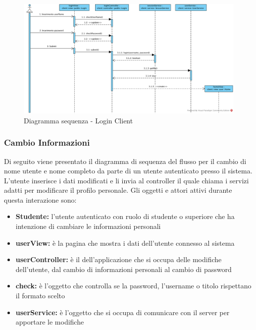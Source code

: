 \documentclass[12pt,a4paper]{article}
\begin{document}
\begin{center}
	\begin{figure}[H]
		\centering \includegraphics[max width=\myheight, angle=90]{../img/diagrammiSequenza/loginClient.png}
		\caption{Diagramma sequenza - Login Client}
	\end{figure}
\end{center}

\newpage
\subsubsection{Cambio Informazioni}
Di seguito viene presentato il diagramma di sequenza del flusso per il cambio di nome utente e nome completo da parte di un utente autenticato presso il sistema. L'utente inserisce i dati modificati e li invia al controller il quale chiama i servizi adatti per modificare il profilo personale. Gli oggetti e attori attivi durante questa interazione sono:

\begin{itemize}
	\item \textbf{Studente:} l'utente autenticato con ruolo di studente o superiore che ha intenzione di cambiare le informazioni personali
	\item \textbf{userView:} è la pagina che mostra i dati dell'utente connesso al sistema
	\item \textbf{userController:} è il  dell'applicazione che si occupa delle modifiche dell'utente, dal cambio di informazioni personali al cambio di password
	\item \textbf{check:} è l'oggetto che controlla se la password, l'username o titolo rispettano il formato scelto	
	\item \textbf{userService:} è l'oggetto che si occupa di comunicare con il server per apportare le modifiche
\end{itemize}
\end{document}
